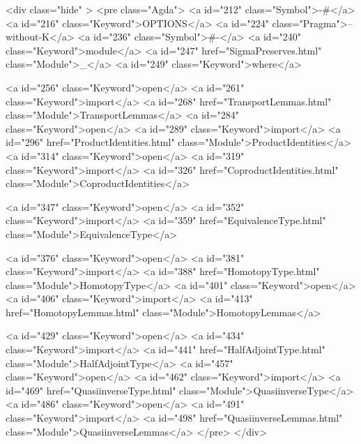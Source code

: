   <div class="hide" >
<pre class="Agda">
<a id="212" class="Symbol">{-#</a> <a id="216" class="Keyword">OPTIONS</a> <a id="224" class="Pragma">--without-K</a> <a id="236" class="Symbol">#-}</a>
<a id="240" class="Keyword">module</a> <a id="247" href="SigmaPreserves.html" class="Module">_</a> <a id="249" class="Keyword">where</a>

<a id="256" class="Keyword">open</a> <a id="261" class="Keyword">import</a> <a id="268" href="TransportLemmas.html" class="Module">TransportLemmas</a>
<a id="284" class="Keyword">open</a> <a id="289" class="Keyword">import</a> <a id="296" href="ProductIdentities.html" class="Module">ProductIdentities</a>
<a id="314" class="Keyword">open</a> <a id="319" class="Keyword">import</a> <a id="326" href="CoproductIdentities.html" class="Module">CoproductIdentities</a>

<a id="347" class="Keyword">open</a> <a id="352" class="Keyword">import</a> <a id="359" href="EquivalenceType.html" class="Module">EquivalenceType</a>

<a id="376" class="Keyword">open</a> <a id="381" class="Keyword">import</a> <a id="388" href="HomotopyType.html" class="Module">HomotopyType</a>
<a id="401" class="Keyword">open</a> <a id="406" class="Keyword">import</a> <a id="413" href="HomotopyLemmas.html" class="Module">HomotopyLemmas</a>

<a id="429" class="Keyword">open</a> <a id="434" class="Keyword">import</a> <a id="441" href="HalfAdjointType.html" class="Module">HalfAdjointType</a>
<a id="457" class="Keyword">open</a> <a id="462" class="Keyword">import</a> <a id="469" href="QuasiinverseType.html" class="Module">QuasiinverseType</a>
<a id="486" class="Keyword">open</a> <a id="491" class="Keyword">import</a> <a id="498" href="QuasiinverseLemmas.html" class="Module">QuasiinverseLemmas</a>
</pre>
</div>

